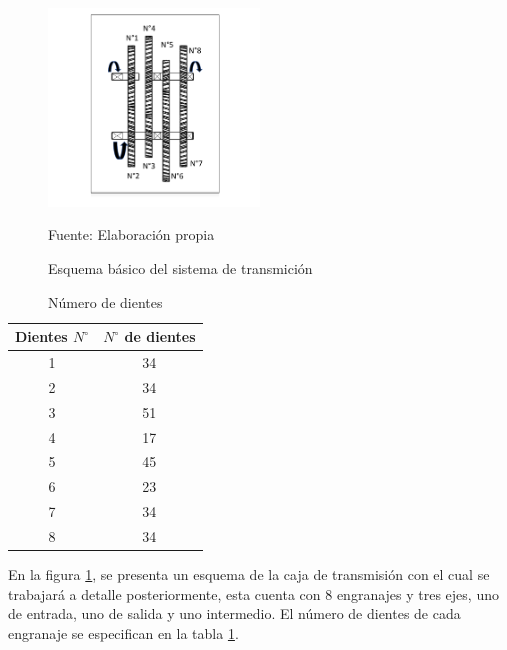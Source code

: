 
\begin{figure}[ht]
    \centering
    \includegraphics[width =0.5\textwidth, trim = {2cm, 0, 2cm, 0}]{Cap4_DisenoBasico/Figura/caja.pdf}
    \caption{Esquema básico del sistema de transmición}{Fuente: Elaboración propia}
    \label{fig:Transmición}
\end{figure}

\begin{table}[hbt]
    \centering
    \begin{tabular}{|c|c|}
        \hline
        \textbf{Dientes $N^{\circ}$} & \textbf{$N^{\circ}$ de dientes} \\ \hline
        1 & 34 \\ \hline
        2 & 34 \\ \hline
        3 & 51 \\ \hline
        4 & 17 \\ \hline
        5 & 45 \\ \hline
        6 & 23 \\ \hline
        7 & 34 \\ \hline
        8 & 34 \\ \hline
    \end{tabular}
    \caption{Número de dientes}
    \label{table:Transmición}
\end{table}


En la figura \ref{fig:Transmición}, se presenta un esquema de la caja de transmisión con el cual se trabajará a detalle posteriormente, esta cuenta con 8 engranajes y tres ejes, uno de entrada, uno de salida y uno intermedio. El número de dientes de cada engranaje se especifican en la tabla \ref{table:Transmición}.

\newpage